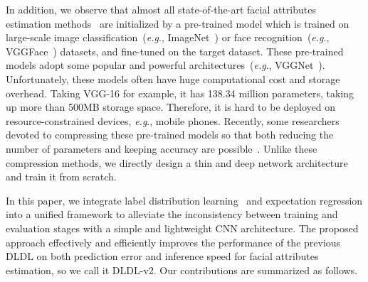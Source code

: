 \documentclass[5p,times,twocolumn]{elsarticle}
\makeatletter
\DeclareRobustCommand\onedot{\@onedot}
\def\@onedot{.}
\def\eg{\emph{e.g}\onedot}
\makeatother
\begin{document}
In addition, we observe that almost all state-of-the-art facial attributes estimation methods~\cite{rodriguez2017age,fan2017label,rothe2016deep,gao2017deep,antipov2016apparent} are initialized by a pre-trained model which is trained on large-scale image classification~(\eg, ImageNet~\cite{deng2009imagenet}) or face recognition~(\eg, VGGFace~\cite{parkhi2015deep}) datasets, and fine-tuned on the target dataset. These pre-trained models adopt some popular and powerful architectures~(\eg, VGGNet~\cite{simonyan2015very}). Unfortunately, these models often have huge computational cost and storage overhead. Taking VGG-16 for example, it has 138.34 million parameters, taking up more than 500MB storage space. Therefore, it is hard to be deployed on resource-constrained devices, \eg, mobile phones. Recently, some researchers devoted to compressing these pre-trained models so that both reducing the number of parameters and keeping accuracy are possible~\cite{iccv2017ThiNet}. Unlike these compression methods, we directly design a thin and deep network architecture and train it from scratch.

\begin{table}
 \centering
 \small
 \caption{Details of facial age and attractiveness datasets.
 }\label{tab:data}
\end{table}

In this paper, we integrate label distribution learning~\cite{geng2016label} and expectation regression into a unified framework to alleviate the inconsistency between training and evaluation stages with a simple and lightweight CNN architecture. The proposed approach effectively and efficiently improves the performance of the previous DLDL on both prediction error and inference speed for facial attributes estimation, so we call it DLDL-v2. Our contributions are summarized as follows.
\end{document}
